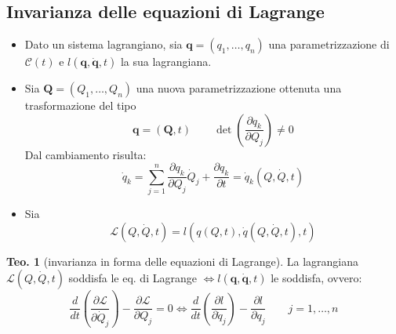 \documentclass[a4paper,10pt]{article}
\theoremstyle{definition}
\newcommand{\bv}{\boldsymbol} %
\theoremstyle{indentdefinition}
\theoremstyle{indenttheorem}
\newtheorem{thm}{Teo.}
\theoremstyle{myremark}
\theoremstyle{indentgeneral}
\begin{document}
\subsection{Invarianza delle equazioni di Lagrange}
\begin{itemize}
    \item Dato un sistema lagrangiano, sia $\bv{q}=(q_1,\dots,q_n)$ una parametrizzazione di $\mathcal{C}(t)$ e $l(\bv{q},\dot{\bv{q}},t)$ la sua lagrangiana.
    \item Sia $\bv{Q}=(Q_1,\dots,Q_n)$ una nuova parametrizzazione ottenuta una trasformazione del tipo 
    $$\bv{q}=(\bv{Q},t)\qquad \det\left(\frac{\partial q_{k}}{\partial Q_{j}}\right)\neq0 $$
    Dal cambiamento risulta:
    $$\dot{q}_{k}  =\sum_{j=1}^{n}\frac{\partial q_{k}}{\partial Q_{j}}\dot{Q}_{j}+\frac{\partial q_{k}}{\partial t}=\dot{q}_{k}\left(Q,\dot{Q},t\right) $$
    \item Sia
    $$\mathcal{L}\left(Q,\dot{Q},t\right)=l\left(q\left(Q,t\right),\dot{q}\left(Q,\dot{Q},t\right),t\right)$$
\end{itemize}




\begin{thm}[invarianza in forma delle equazioni di Lagrange]
La lagrangiana $\mathcal{L}\left(Q,\dot{Q},t\right)$ soddisfa le eq. di Lagrange $\iff l(\bv{q},\dot{\bv{q}},t)$ le soddisfa, ovvero:
$$\frac{d}{dt}\left(\frac{\partial\mathcal{L}}{\partial\dot{Q}_{j}}\right)-\frac{\partial\mathcal{L}}{\partial Q_{j}}=0\iff \frac{d}{dt}\left(\frac{\partial l}{\partial\dot{q}_{j}}\right)-\frac{\partial l}{\partial q_{j}}\qquad j=1,\dots,n$$
\end{thm}
\end{document}
